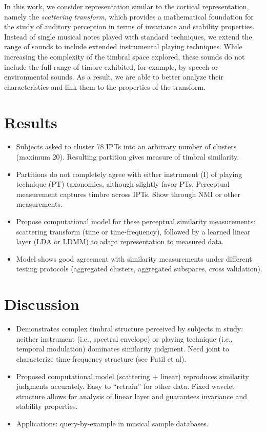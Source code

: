 \documentclass{article}
\begin{document}
In this work, we consider representation similar to the cortical representation, namely the \emph{scattering transform}, which provides a mathematical foundation for the study of auditory perception in terms of invariance and stability properties.
Instead of single musical notes played with standard techniques, we extend the range of sounds to include extended instrumental playing techniques.
While increasing the complexity of the timbral space explored, these sounds do not include the full range of timbre exhibited, for example, by speech or environmental sounds.
As a result, we are able to better analyze their characteristics and link them to the properties of the transform.


\section{Results}
\label{sec:results}

\begin{itemize}
\item Subjects asked to cluster 78 IPTs into an arbitrary number of clusters (maximum 20). Resulting partition gives measure of timbral similarity.
\item Partitions do not completely agree with either instrument (I) of playing technique (PT) taxonomies, although slightly favor PTs. Perceptual measurement captures timbre across IPTs. Show through NMI or other measurements.
\item Propose computational model for these perceptual similarity measurements: scattering transform (time or time-frequency), followed by a learned linear layer (LDA or LDMM) to adapt representation to measured data.
\item Model shows good agreement with similarity measurements under different testing protocols (aggregated clusters, aggregated subspaces, cross validation).
\end{itemize}

\section{Discussion}
\label{sec:discussion}

\begin{itemize}
\item Demonstrates complex timbral structure perceived by subjects in study: neither instrument (i.e., spectral envelope) or playing technique (i.e., temporal modulation) dominates similarity judgment. Need joint to characterize time-frequency structure (see Patil et al).
\item Proposed computational model (scattering + linear) reproduces similarity judgments accurately. Easy to ``retrain'' for other data. Fixed wavelet structure allows for analysis of linear layer and guarantees invariance and stability properties.
\item Applications: query-by-example in musical sample databases.
\end{itemize}
\end{document}
